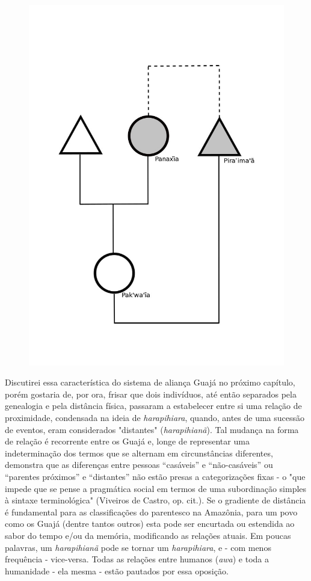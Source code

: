 \begin{figure}[H]
\centering
  \includegraphics[width=\textwidth]{./imgs/Figura_5}
\end{figure}

Discutirei essa característica do sistema de aliança Guajá no próximo
capítulo, porém gostaria de, por ora, frisar que dois indivíduos, até
então separados pela genealogia e pela distância física, passaram a
estabelecer entre si uma relação de proximidade, condensada na ideia de
\emph{harapihiara}, quando, antes de uma sucessão de eventos, eram
considerados "distantes" (\emph{harapihianã}). Tal mudança na forma de
relação é recorrente entre os Guajá e, longe de representar uma
indeterminação dos termos que se alternam em circunstâncias diferentes,
demonstra que as diferenças entre pessoas ``casáveis'' e
``não-casáveis'' ou ``parentes próximos'' e ``distantes'' não estão
presas a categorizações fixas - o "que impede que se pense a pragmática
social em termos de uma subordinação simples à sintaxe terminológica"
(Viveiros de Castro, op. cit.). Se o gradiente de distância é
fundamental para as classificações do parentesco na Amazônia, para um
povo como os Guajá (dentre tantos outros) esta pode ser encurtada ou
estendida ao sabor do tempo e/ou da memória, modificando as relações
atuais. Em poucas palavras, um \emph{harapihianã} pode se tornar um
\emph{harapihiara}, e - com menos frequência - vice-versa. Todas as
relações entre humanos (\emph{awa}) e toda a humanidade - ela mesma -
estão pautados por essa oposição.

